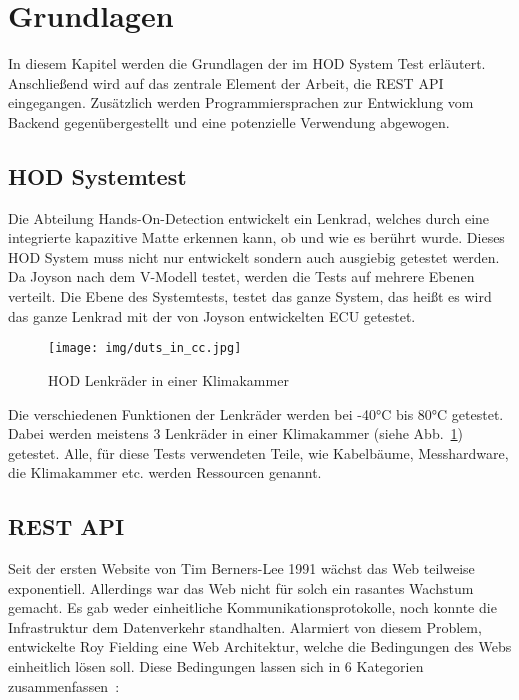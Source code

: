 \section{Grundlagen}
In diesem Kapitel werden die Grundlagen der im \gls{HOD} System Test erläutert.
Anschließend wird auf das zentrale Element der Arbeit, die REST API eingegangen.
Zusätzlich werden Programmiersprachen zur Entwicklung vom \gls{Backend} 
gegenübergestellt und eine potenzielle Verwendung abgewogen.

\subsection{HOD Systemtest}
Die Abteilung Hands-On-Detection entwickelt ein Lenkrad, welches durch eine 
integrierte kapazitive Matte erkennen kann, ob und wie es berührt wurde.
Dieses \gls{HOD} System muss nicht nur entwickelt sondern auch ausgiebig getestet werden.
Da Joyson nach dem V-Modell testet, werden die Tests auf mehrere Ebenen verteilt.
Die Ebene des Systemtests, testet das ganze System, das heißt es wird das ganze
Lenkrad mit der von Joyson entwickelten \gls{ECU} getestet.

\begin{figure}[H]
    \texttt{[image: img/duts\_in\_cc.jpg]}
    \centering
    \caption{HOD Lenkräder in einer Klimakammer}\label{fig:cc}
\end{figure}

Die verschiedenen Funktionen der Lenkräder werden bei -40°C bis 80°C getestet.
Dabei werden meistens 3 Lenkräder in einer Klimakammer (siehe Abb.~\ref{fig:cc}) getestet.
Alle, für diese Tests verwendeten Teile, wie Kabelbäume, Messhardware, die 
Klimakammer etc. werden Ressourcen genannt.


\subsection{REST API}\label{sec:restapi}
Seit der ersten Website von Tim Berners-Lee 1991 wächst das Web teilweise 
exponentiell. Allerdings war das Web nicht für solch ein rasantes Wachstum gemacht.
Es gab weder einheitliche Kommunikationsprotokolle, noch konnte die Infrastruktur
dem Datenverkehr standhalten. Alarmiert von diesem Problem, entwickelte Roy Fielding
eine Web Architektur, welche die Bedingungen des Webs einheitlich lösen soll.
Diese Bedingungen lassen sich in 6 Kategorien zusammenfassen~\cite{Mas11}:

